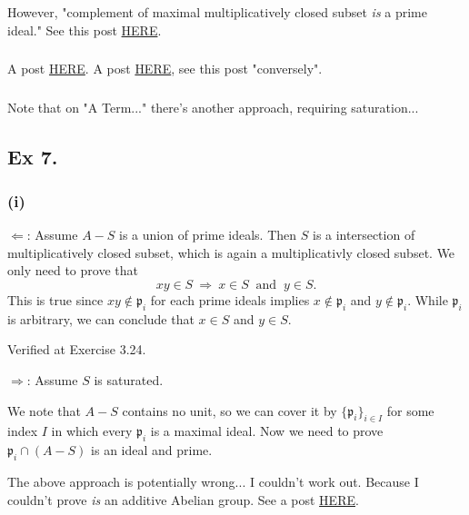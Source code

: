 However, "complement of maximal multiplicatively closed subset \textit{is} a prime ideal." See this post \href{https://math.stackexchange.com/questions/3704318/complement-of-multiplicative-set-is-a-prime-ideal}{HERE}. 

\subsubsection{}
A post \href{https://math.stackexchange.com/questions/25739/complement-of-maximal-multiplicative-set-is-a-prime-ideal}{HERE}. A post \href{https://math.stackexchange.com/questions/3962023/atiyah-macdonald-exercise-3-6}{HERE}, see this post "conversely". 

\subsubsection{}

Note that on "A Term..." there's another approach, requiring saturation... 

\subsection{Ex 7.}

\subsubsection{(i)}

$\Leftarrow$: Assume $A-S$ is a union of prime ideals. Then $S$ is a intersection of multiplicatively closed subset, which is again a multiplicativly closed subset. We only need to prove that 
$$xy\in S ~\Rightarrow~ x\in S ~\text{ and }~ y\in S.$$
This is true since $xy\notin \mathfrak p_i$ for each prime ideals implies $x\notin\mathfrak p_i$ and $y\notin\mathfrak p_i$. While $\mathfrak p_i$ is arbitrary, we can conclude that $x\in S$ and $y\in S$.

Verified at \cite{altman} Exercise 3.24. 

$\Rightarrow$: Assume $S$ is saturated. 

We note that $A-S$ contains no unit, so we can cover it by $\{\mathfrak p_i\}_{i\in I}$ for some index $I$ in which every $\mathfrak p_i$ is a maximal ideal. 
Now we need to prove $\mathfrak p_i\cap (A-S)$ is an ideal and prime. 

The above approach is potentially wrong... I couldn't work out. Because I couldn't prove \textit{is} an additive Abelian group. 
See a post \href{https://math.stackexchange.com/questions/4329999/saturated-set-and-union-of-prime-ideals}{HERE}. 

